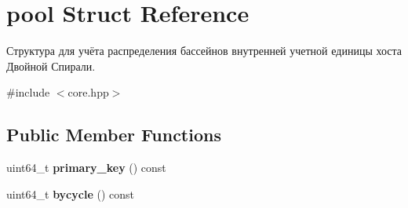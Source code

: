 \hypertarget{structpool}{}\section{pool Struct Reference}
\label{structpool}


Структура для учёта распределения бассейнов внутренней учетной единицы хоста Двойной Спирали.  




{\ttfamily \#include $<$core.\+hpp$>$}

\subsection*{Public Member Functions}
\begin{DoxyCompactItemize}
\item 
\mbox{\label{structpool_a6ff21f4b3d828f6be2ab5a8214d05e47}} 
uint64\+\_\+t {\bfseries primary\+\_\+key} () const
\item 
\mbox{\label{structpool_ad4ba2fac7edc59ef01fe0ec3c8fb9187}} 
uint64\+\_\+t {\bfseries bycycle} () const
\end{DoxyCompactItemize}
